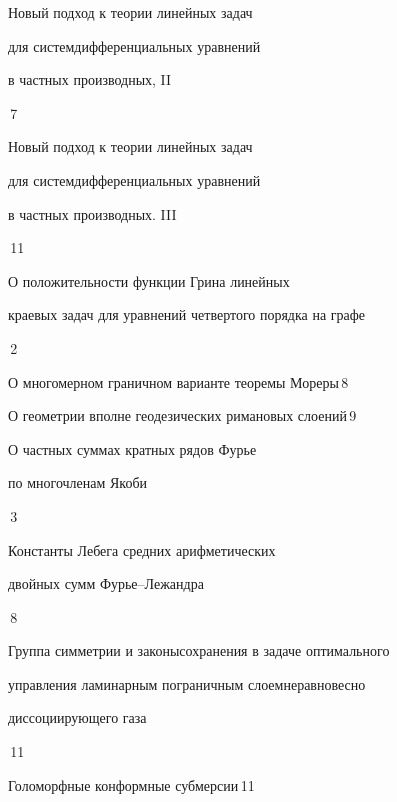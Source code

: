 

{Новый подход к теории линейных задач  


для систем\newline дифференциальных уравнений  


в частных производных, II}{\No\,7}




{Новый подход к теории линейных задач


для систем\newline дифференциальных уравнений


в частных производных. III}{\No\,11}




{О положительности функции Грина линейных\newline


краевых задач для уравнений четвертого порядка на графе}{\No\,2}




{О многомерном граничном варианте теоремы Мореры}{\No\,8}




{О геометрии вполне геодезических римановых слоений}{\No\,9}




{О частных суммах кратных рядов Фурье 


по многочленам Якоби}{\No\,3}




{Константы Лебега средних арифметических 


двойных сумм Фурье--Лежандра}{\No\,8}






{Группа симметрии и законы\newline сохранения в задаче оптимального 


управления ламинарным пограничным слоем\newline неравновесно 


диссоциирующего газа}{\No\,11}




{Голоморфные конформные субмерсии}{\No\,11}


